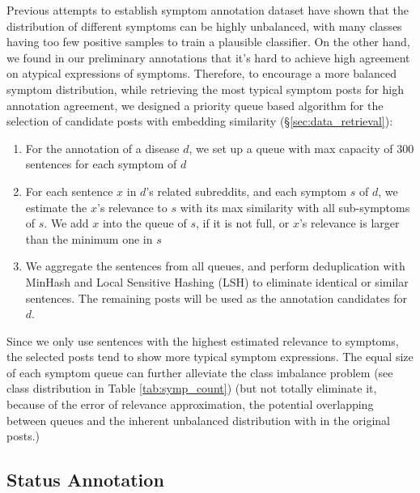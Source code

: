 Previous attempts to establish symptom annotation dataset \citep{mowery2017understanding} have shown that the distribution of different symptoms can be highly unbalanced, with many classes having too few positive samples to train a plausible classifier. On the other hand, we found in our preliminary annotations that it's hard to achieve high agreement on atypical expressions of symptoms. Therefore, to encourage a more balanced symptom distribution, while retrieving the most typical symptom posts for high annotation agreement, we designed a priority queue based algorithm for the selection of candidate posts with embedding similarity (\S \ref{sec:data_retrieval}):
\begin{enumerate}
    \item For the annotation of a disease $d$, we set up a queue with max capacity of 300 sentences for each symptom of $d$
    \item For each sentence $x$ in $d$'s related subreddits, and each symptom $s$ of $d$, we estimate the $x$'s relevance to $s$ with its max similarity with all sub-symptoms of $s$. We add $x$ into the queue of $s$, if it is not full, or $x$'s relevance is larger than the minimum one in $s$
    \item We aggregate the sentences from all queues, and perform deduplication with MinHash and Local Sensitive Hashing (LSH) \citep{leskovec2020mining} to eliminate identical or similar sentences. The remaining posts will be used as the annotation candidates for $d$.
\end{enumerate}

Since we only use sentences with the highest estimated relevance to symptoms, the selected posts tend to show more typical symptom expressions. The equal size of each symptom queue can further alleviate the class imbalance problem (see class distribution in Table \ref{tab:symp_count}) (but not totally eliminate it, because of the error of relevance approximation, the potential overlapping between queues and the inherent unbalanced distribution with in the original posts.)

\subsection{Status Annotation}

